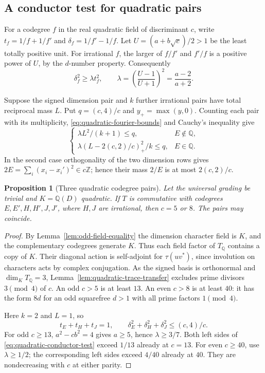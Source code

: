 \documentclass[11pt,reqno]{amsart}
\newtheorem{proposition}[theorem]{Proposition}
\theoremstyle{remark}\newtheorem{remark}[theorem]{Remark}
\numberwithin{equation}{section}
\begin{document}
\subsection{A conductor test for quadratic pairs}
For a codegree $f$ in the real quadratic field of discriminant $c$,
write $t_f=1/f+1/f'$ and $\delta_f=1/f'-1/f$. Let
$U=(a+b\sqrt c)/2>1$ be the least totally positive unit.
For irrational $f$, the larger of $f/f'$ and $f'/f$ is a positive
power of $U$, by the $d$-number property. Consequently
\begin{equation}\label{eq:r6-pair-gap}
       \delta_f^2\ge\lambda t_f^2,\qquad
       \lambda=\left(\frac{U-1}{U+1}\right)^2=\frac{a-2}{a+2}.
\end{equation}

Suppose the signed dimension pair and $k$ further irrational pairs
have total reciprocal mass $L$. Put $q=(c,4)/c$ and $y_+=\max(y,0)$.
Counting each pair with its multiplicity, \eqref{eq:quadratic-fourier-bounds}
and Cauchy's inequality give
\begin{equation}\label{eq:quadratic-conductor-test}
 \begin{cases}
    \lambda L^2/(k+1)\le q,&E\notin\mathbb Q,\\
    \lambda (L-2(c,2)/c)_+^2/k\le q,&E\in\mathbb Q .
 \end{cases}
\end{equation}
In the second case orthogonality of the two dimension rows gives
$2E=\sum_i(x_i-x_i')^2\in c\mathbb Z$; hence their mass $2/E$ is at
most $2(c,2)/c$.

\begin{proposition}[Three quadratic codegree pairs]
\label{prop:r6-three-quadratic-pairs}
Let the universal grading be trivial and $K=\mathbb Q(D)$ quadratic.
If $T$ is commutative with codegrees $E,E',H,H',J,J'$, where $H,J$
are irrational, then $c=5$ or $8$. The pairs may coincide.
\end{proposition}
\begin{proof}
By Lemma~\ref{lem:odd-field-equality} the dimension character field is
$K$, and the complementary codegrees generate $K$. Thus each field
factor of $T_{\mathbb Q}$ contains a copy of $K$. Their diagonal action
is self-adjoint for $\tau(uv^*)$, since involution on characters
acts by complex conjugation. As the signed basis is orthonormal and
$\dim_K T_{\mathbb Q}=3$, Lemma~\ref{lem:quadratic-trace-transfer}
excludes prime divisors $3\pmod4$ of $c$. An odd $c>5$ is at least
$13$. An even $c>8$ is at least $40$: it has the form $8d$ for an
odd squarefree $d>1$ with all prime factors $1\pmod4$.

Here $k=2$ and $L=1$, so
\begin{equation}\label{eq:r6-three-pair-fourier}
   t_E+t_H+t_J=1,\qquad
   \delta_E^2+\delta_H^2+\delta_J^2\le (c,4)/c .
\end{equation}
For odd $c\ge13$, $a^2-cb^2=4$ gives $a\ge5$, hence
$\lambda\ge3/7$. Both left sides of \eqref{eq:quadratic-conductor-test}
exceed $1/13$ already at $c=13$. For even $c\ge40$, use
$\lambda\ge1/2$; the corresponding left sides exceed $4/40$
already at $40$. They are nondecreasing with $c$ at either parity.
\end{proof}
\end{document}
